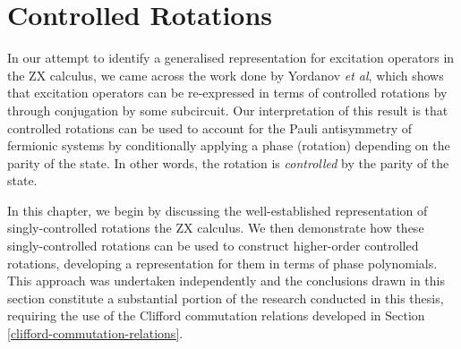 \chapter{Controlled Rotations}%
\label{controlled-rotations}

In our attempt to identify a generalised representation for excitation operators in the ZX calculus, we came across the work done by Yordanov \textit{et al}, which shows that excitation operators can be re-expressed in terms of controlled rotations by through conjugation by some subcircuit. Our interpretation of this result is that controlled rotations can be used to account for the Pauli antisymmetry of fermionic systems by conditionally applying a phase (rotation) depending on the parity of the state. In other words, the rotation is \textit{controlled} by the parity of the state.

In this chapter, we begin by discussing the well-established representation of singly-controlled rotations the ZX calculus. We then demonstrate how these singly-controlled rotations can be used to construct higher-order controlled rotations, developing a representation for them in terms of phase polynomials. This approach was undertaken independently and the conclusions drawn in this section constitute a substantial portion of the research conducted in this thesis, requiring the use of the Clifford commutation relations developed in Section \ref{clifford-commutation-relations}.
